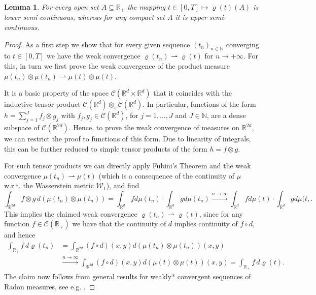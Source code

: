 \documentclass[A4paper,11pt]{article}
\newtheorem{lemma}[theorem]{Lemma}
\theoremstyle{definition}
\newcommand{\N}{\mathbb{N}}
\newcommand{\R}{\mathbb{R}}
\newcommand{\W}{\mathcal{W}}
\begin{document}
\begin{lemma}\label{rhosc}
	For every open set $A\subseteq\R_+$ the mapping $t \in [0,T] \mapsto\varrho(t)(A)$ is lower semi-continuous, whereas for
	any compact set $A$ it is upper semi-continuous.
\end{lemma}

\begin{proof}As a first step we show that for every given sequence $(t_n)_{n \in \N}$ converging to $t\in [0,T]$ we have the weak
	convergence $\varrho(t_n)\rightharpoonup\varrho(t)$ for $n \rightarrow +\infty$. For this, in turn we first prove the weak convergence of the product measure
	$\mu(t_n)\otimes\mu(t_n)\rightharpoonup\mu(t)\otimes\mu(t)$.
	
	It is a basic property of the space $\mathcal{C}(\R^d\times\R^d)$ that it coincides with the inductive tensor product
	$\mathcal{C}(\R^d)\otimes_\varepsilon \mathcal{C}(\R^d)$. In particular, functions of the form $h=\sum_{j=1}^J f_j\otimes g_j$ with
	$f_j,g_j\in \mathcal{C}(\R^d)$, for $j=1,\ldots,J$ and $J\in\N$, are a dense subspace of $\mathcal{C}(\R^{2d})$. Hence, to prove the weak
	convergence of measures on $\R^{2d}$, we can restrict the proof to functions of this form. Due to linearity of
	integrals, this can be further reduced to simple tensor products of the form $h=f\otimes g$.
	
	For such tensor products we can directly apply Fubini's Theorem and the weak convergence
	$\mu(t_n)\rightharpoonup\mu(t)$ (which is a consequence of the continuity of $\mu$ w.r.t. the
	Wasserstein metric $\W_1$), and find
	\[
		\int_{\R^{2d}}f\otimes g\, d(\mu(t_n)\otimes\mu(t_n))
			=\int_{\R^d}f d\mu(t_n)\cdot\int_{\R^d}g d\mu(t_n)
			\stackrel{n\rightarrow\infty}{\longrightarrow}\int_{\R^d}f d\mu(t)\cdot\int_{\R^d}g d\mu(t,.
	\]
	This implies the claimed weak convergence $\varrho(t_n)\rightharpoonup\varrho(t)$, since for any
	function $f\in \mathcal{C}(\R_+)$ we have that the continuity of $d$ implies continuity of $f\circ d$, and hence
	\begin{align*}
		\int_{\R_+}f\,d\varrho(t_n)
			&=\int_{\R^{2d}}(f\circ d)(x,y)d(\mu(t_n)\otimes\mu(t_n))(x,y)\\
			&\stackrel{n\rightarrow\infty}{\longrightarrow}
				\int_{\R^{2d}}(f\circ d)(x,y)d(\mu(t)\otimes\mu(t))(x,y)
			=\int_{\R_+}f\,d\varrho(t).
	\end{align*}
	The claim now follows from general results for weakly* convergent sequences of Radon measures, see e.g. \cite[Proposition 1.62]{AFP00}.
\end{proof}
\end{document}
